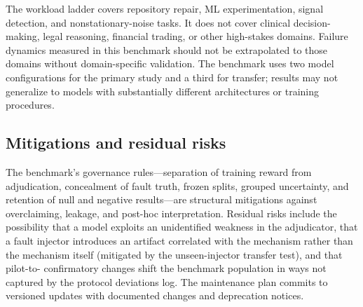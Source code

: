 The workload ladder covers repository repair, ML experimentation, signal
detection, and nonstationary-noise tasks. It does not cover clinical
decision-making, legal reasoning, financial trading, or other high-stakes
domains. Failure dynamics measured in this benchmark should not be
extrapolated to those domains without domain-specific validation. The
benchmark uses two model configurations for the primary study and a third
for transfer; results may not generalize to models with substantially
different architectures or training procedures.

\subsection{Mitigations and residual risks}

The benchmark's governance rules—separation of training reward from
adjudication, concealment of fault truth, frozen splits, grouped
uncertainty, and retention of null and negative results—are structural
mitigations against overclaiming, leakage, and post-hoc interpretation.
Residual risks include the possibility that a model exploits an
unidentified weakness in the adjudicator, that a fault injector introduces
an artifact correlated with the mechanism rather than the mechanism itself
(mitigated by the unseen-injector transfer test), and that pilot-to-
confirmatory changes shift the benchmark population in ways not captured
by the protocol deviations log. The maintenance plan commits to versioned
updates with documented changes and deprecation notices.
